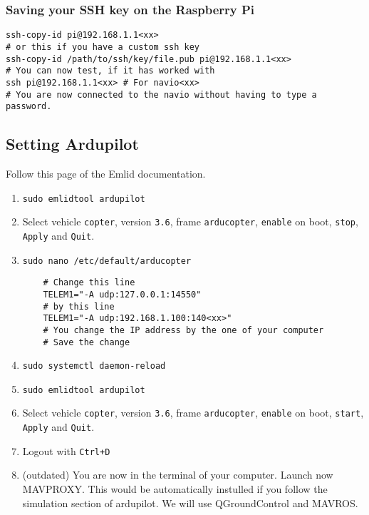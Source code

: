 \subsubsection{Saving your SSH key on the Raspberry Pi}

\begin{verbatim}
ssh-copy-id pi@192.168.1.1<xx>
# or this if you have a custom ssh key
ssh-copy-id /path/to/ssh/key/file.pub pi@192.168.1.1<xx>
# You can now test, if it has worked with
ssh pi@192.168.1.1<xx> # For navio<xx>
# You are now connected to the navio without having to type a password.
                \end{verbatim}

\subsection{Setting Ardupilot}
Follow this page \cite{emlid_ardupilot_installation} of the Emlid documentation.

\begin{enumerate}
    \item \texttt{sudo emlidtool ardupilot}
    \item Select vehicle \texttt{copter}, version \texttt{3.6}, frame \texttt{arducopter}, \texttt{enable} on boot, \texttt{stop}, \texttt{Apply} and \texttt{Quit}.
    \item \texttt{sudo nano /etc/default/arducopter}


          \begin{verbatim}
    # Change this line
    TELEM1="-A udp:127.0.0.1:14550"
    # by this line
    TELEM1="-A udp:192.168.1.100:140<xx>"
    # You change the IP address by the one of your computer
    # Save the change
                \end{verbatim}


    \item \texttt{sudo systemctl daemon-reload}
    \item \texttt{sudo emlidtool ardupilot}
    \item Select vehicle \texttt{copter}, version \texttt{3.6}, frame \texttt{arducopter}, \texttt{enable} on boot, \texttt{start}, \texttt{Apply} and \texttt{Quit}.
    \item Logout with \texttt{Ctrl+D}
    \item (outdated) You are now in the terminal of your computer. Launch now MAVPROXY. This would be automatically instulled if you follow the simulation section of ardupilot. We will use QGroundControl and MAVROS.
\end{enumerate}

